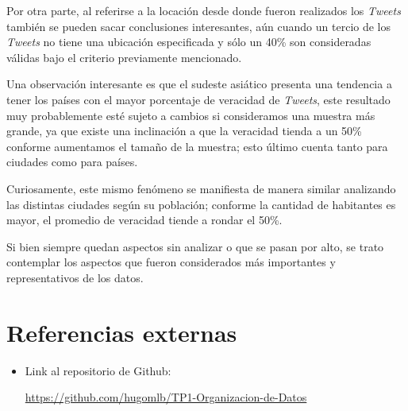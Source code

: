 \documentclass[titlepage,a4paper]{article}
\begin{document}
    Por otra parte, al referirse a la locación desde donde fueron realizados los \textit{Tweets} también se pueden sacar conclusiones interesantes, aún cuando un tercio de los \textit{Tweets} no tiene una ubicación especificada y sólo un 40\% son consideradas válidas bajo el criterio previamente mencionado.

    Una observación interesante es que el sudeste asiático presenta una tendencia a tener los países con el mayor porcentaje de veracidad de \textit{Tweets}, este resultado muy probablemente esté sujeto a cambios si consideramos una muestra más grande, ya que existe una inclinación a que la veracidad tienda a un 50\% conforme aumentamos el tamaño de la muestra; esto último cuenta tanto para ciudades como para países.
    
    Curiosamente, este mismo fenómeno se manifiesta de manera similar analizando las distintas ciudades según su población; conforme la cantidad de habitantes es mayor, el promedio de veracidad tiende a rondar el 50\%. 
  
    Si bien siempre quedan aspectos sin analizar o que se pasan por alto, se trato contemplar los aspectos que fueron considerados más importantes y representativos de los datos.
    
    
\newpage
    \section{Referencias externas}\label{sec:intro}
    
    \begin{itemize}
        \item Link al repositorio de Github:
            
            \href{https://github.com/hugomlb/TP1-Organizacion-de-Datos}{https://github.com/hugomlb/TP1-Organizacion-de-Datos}
            
    \end{itemize}
\end{document}
